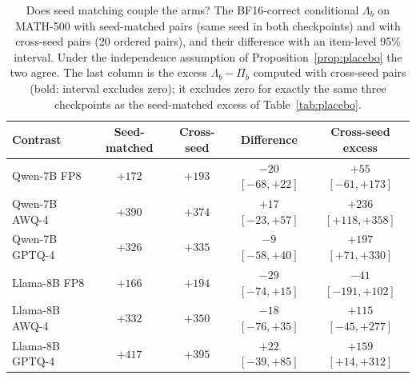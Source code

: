 \begin{table}[t]
\centering
\caption{Does seed matching couple the arms? The BF16-correct conditional $\Lambda_b$ on MATH-500 with seed-matched pairs (same seed in both checkpoints) and with cross-seed pairs (20 ordered pairs), and their difference with an item-level 95\% interval. Under the independence assumption of Proposition~\ref{prop:placebo} the two agree. The last column is the excess $\Lambda_b-\Pi_b$ computed with cross-seed pairs (bold: interval excludes zero); it excludes zero for exactly the same three checkpoints as the seed-matched excess of Table~\ref{tab:placebo}.}
\label{tab:coupling}
\small
\begin{tabular}{lcccc}
\toprule
\textbf{Contrast} & \textbf{Seed-matched} & \textbf{Cross-seed} & \textbf{Difference} & \textbf{Cross-seed excess} \\
\midrule
Qwen-7B FP8 & $+172$ & $+193$ & $-20$ $[-68,+22]$ & $+55$ $[-61,+173]$ \\
Qwen-7B AWQ-4 & $+390$ & $+374$ & $+17$ $[-23,+57]$ & \textbf{$+236$ $[+118,+358]$} \\
Qwen-7B GPTQ-4 & $+326$ & $+335$ & $-9$ $[-58,+40]$ & \textbf{$+197$ $[+71,+330]$} \\
Llama-8B FP8 & $+166$ & $+194$ & $-29$ $[-74,+15]$ & $-41$ $[-191,+102]$ \\
Llama-8B AWQ-4 & $+332$ & $+350$ & $-18$ $[-76,+35]$ & $+115$ $[-45,+277]$ \\
Llama-8B GPTQ-4 & $+417$ & $+395$ & $+22$ $[-39,+85]$ & \textbf{$+159$ $[+14,+312]$} \\
\bottomrule
\end{tabular}
\end{table}
